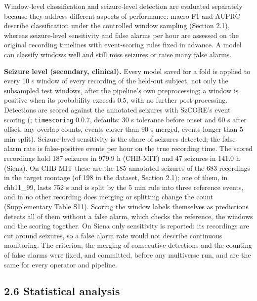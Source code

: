 \documentclass[11pt,a4paper]{article}
\begin{document}
Window-level classification and seizure-level detection are evaluated separately
because they address different aspects of performance: macro F1 and AUPRC describe
classification under the controlled window sampling (Section 2.1), whereas
seizure-level sensitivity and false alarms per hour are assessed on the original
recording timelines with event-scoring rules fixed in advance. A model can classify
windows well and still miss seizures or raise many false alarms.

\textbf{Seizure level (secondary, clinical).} Every model saved for a fold is applied to
every 10 s window of every recording of the held-out subject, not only the subsampled
test windows, after the pipeline's own preprocessing; a window is positive when its
probability exceeds 0.5, with no further post-processing. Detections are scored
against the annotated seizures with SzCORE's event scoring (\citealp{Dan_2025};
\nolinkurl{timescoring} 0.0.7, defaults: 30 s tolerance before onset and 60 s after offset, any
overlap counts, events closer than 90 s merged, events longer than 5 min split).
Seizure-level sensitivity is the share of seizures detected; the false alarm rate is
false-positive events per hour on the true recording time. The scored recordings hold
187 seizures in 979.9 h (CHB-MIT) and 47 seizures in 141.0 h (Siena). On CHB-MIT these
are the 185 annotated seizures of the 683 recordings in the target montage (of 198 in
the dataset, Section 2.1); one of them, in chb11\_99, lasts 752 s and is split by the
5 min rule into three reference events, and in no other recording does merging or
splitting change the count (Supplementary Table S11). Scoring the
window labels themselves as predictions detects all of them without a false alarm,
which checks the reference, the windows and the scoring together. On Siena only
sensitivity is reported: its recordings are cut around seizures, so a false alarm
rate would not describe continuous monitoring. The criterion, the merging of
consecutive detections and the counting of false alarms were fixed, and committed,
before any multiverse run, and are the same for every operator and
pipeline.

\subsection{2.6 Statistical analysis}\label{statistical-analysis}
\end{document}
